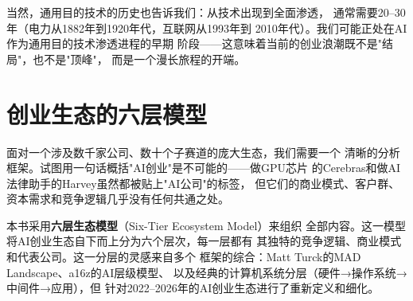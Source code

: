 当然，通用目的技术的历史也告诉我们：从技术出现到全面渗透，
通常需要20--30年（电力从1882年到1920年代，互联网从1993年到
2010年代）。我们可能正处在AI作为通用目的技术渗透进程的早期
阶段——这意味着当前的创业浪潮既不是"结局"，也不是"顶峰"，
而是一个漫长旅程的开端。


\section{创业生态的六层模型}
\label{sec:overview-six-tier}

面对一个涉及数千家公司、数十个子赛道的庞大生态，我们需要一个
清晰的分析框架。试图用一句话概括"AI创业"是不可能的——做GPU芯片
的Cerebras和做AI法律助手的Harvey虽然都被贴上"AI公司"的标签，
但它们的商业模式、客户群、资本需求和竞争逻辑几乎没有任何共通之处。

本书采用\textbf{六层生态模型}（Six-Tier Ecosystem Model）来组织
全部内容。这一模型将AI创业生态自下而上分为六个层次，每一层都有
其独特的竞争逻辑、商业模式和代表公司。这一分层的灵感来自多个
框架的综合：Matt Turck的MAD Landscape、a16z的AI层级模型、
以及经典的计算机系统分层（硬件→操作系统→中间件→应用），但
针对2022--2026年的AI创业生态进行了重新定义和细化。


